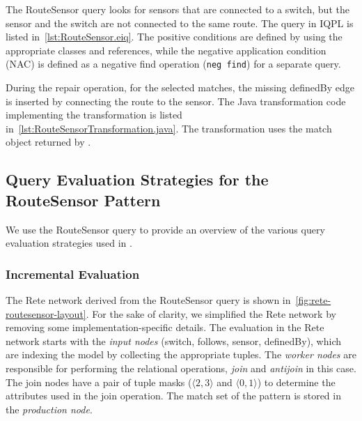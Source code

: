 \documentclass[submission,copyright,creativecommons]{eptcs}
\begin{document}
The \textsf{RouteSensor} query looks for sensors that are connected to a switch, but the sensor and the switch are not connected to the same route. The query in IQPL is listed in~\autoref{lst:RouteSensor.eiq}. The positive conditions are defined by using the appropriate classes and references, while the negative application condition (NAC) is defined as a negative find operation (\texttt{neg find}) for a separate query.



During the \textsf{repair} operation, for the selected matches, the missing \textsf{definedBy} edge is inserted by connecting the
route to the sensor. The Java transformation code implementing the transformation is listed in~\autoref{lst:RouteSensorTransformation.java}. The transformation uses the match object returned by \eiq.


\vspace{0.5em}



\subsection{Query Evaluation Strategies for the \textsf{RouteSensor} Pattern}

We use the \textsf{RouteSensor} query to provide an overview of the various query evaluation strategies used in \eiq.

\subsubsection{Incremental Evaluation}

The Rete network derived from the \textsf{RouteSensor} query is shown in~\autoref{fig:rete-routesensor-layout}. For the sake of clarity, we simplified the Rete network by removing some implementation-specific details. The evaluation in the Rete network starts with the \emph{input nodes} (\textsf{switch}, \textsf{follows}, \textsf{sensor}, \textsf{definedBy}), which are indexing the model by collecting the appropriate tuples. The \emph{worker nodes} are responsible for performing the relational operations, \emph{join} and \emph{antijoin} in this case. The join nodes have a pair of tuple masks (\eg $\langle 2, 3 \rangle$ and $\langle 0, 1 \rangle$) to determine the attributes used in the join operation. The match set of the pattern is stored in the \emph{production node}.
\end{document}
